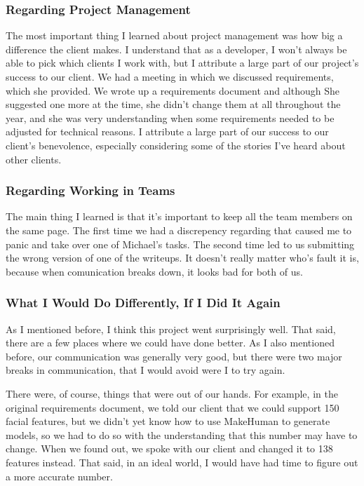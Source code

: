 \documentclass[letterpaper,10pt, onecolumn, draftclsnofoot]{IEEEtran}
\begin{document}
\subsubsection{Regarding Project Management}
The most important thing I learned about project management was how big a difference the client makes. I understand that as a developer, I won't always be able to pick which clients I work with, but I attribute a large part of our project's success to our client. We had a meeting in which we discussed requirements, which she provided. We wrote up a requirements document and although She suggested one more at the time, she didn't change them at all throughout the year, and she was very understanding when some requirements needed to be adjusted for technical reasons. I attribute a large part of our success to our client's benevolence, especially considering some of the stories I've heard about other clients.

\subsubsection{Regarding Working in Teams}
The main thing I learned is that it's important to keep all the team members on the same page. The first time we had a discrepency regarding that caused me to panic and take over one of Michael's tasks. The second time led to us submitting the wrong version of one of the writeups. It doesn't really matter who's fault it is, because when comunication breaks down, it looks bad for both of us.

\subsubsection{What I Would Do Differently, If I Did It Again}
As I mentioned before, I think this project went surprisingly well. That said, there are a few places where we could have done better. As I also mentioned before, our communication was generally very good, but there were two major breaks in communication, that I would avoid were I to try again. 

There were, of course, things that were out of our hands. For example, in the original requirements document, we told our client that we could support 150 facial features, but we didn't yet know how to use MakeHuman to generate models, so we had to do so with the understanding that this number may have to change. When we found out, we spoke with our client and changed it to 138 features instead. That said, in an ideal world, I would have had time to figure out a more accurate number.
\end{document}
